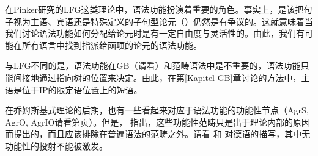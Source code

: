 在Pinker研究的LFG\indexlfgc{}这类理论中，语法功能扮演着重要的角色。事实上，是该把句子视为主语、宾语还是特殊定义的子句型论元（\xcompc）\citep*{DL2000a-u,Berman2003b-u,Berman2007a-u,AMM2005a-u,Forst2006a-u}仍然是有争议的。这就意味着当我们讨论语法功能如何分配给论元时是有一定自由度与灵活性的。由此，我们有可能在所有语言中找到指派给函项的论元的语法功能。

与LFG不同的是，语法功能在GB（请看\citealp{Williams84a,Sternefeld85a}）和范畴语法\indexcgc 中是不重要的，语法功能只能间接地通过指向树的位置来决定。由此，在第\ref{Kapitel-GB}章讨论的方法中，主语是位于IP的限定语位置上的短语。

在乔姆斯基式理论的后期，也有一些看起来对应于语法功能的功能性节点（AgrS,
AgrO, AgrIO请看第\pageref{Seite-AgrO}页）。但是， \citet[\S~4.10.1]{Chomsky95a-u}指出，这些功能性范畴只是出于理论内部的原因而提出的，而且应该排除在普遍语法的范畴之外。请看 和 对德语的描写，其中无功能性的投射不能被激发。

